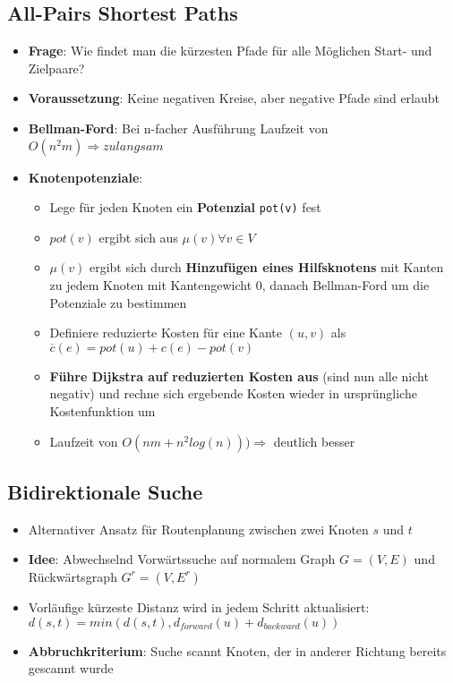 \subsection{All-Pairs Shortest Paths}%
\label{sp:sub:all_pairs_shortest_paths}

\begin{itemize}
	\item \textbf{Frage}: Wie findet man die kürzesten Pfade für alle Möglichen Start- und Zielpaare?
	\item \textbf{Voraussetzung}: Keine negativen Kreise, aber negative Pfade sind erlaubt
	\item \textbf{Bellman-Ford}: Bei n-facher Ausführung Laufzeit von $O(n^2m) \Rightarrow zu langsam$
	\item \textbf{Knotenpotenziale}:
	\begin{itemize}
		\item Lege für jeden Knoten ein \textbf{Potenzial} \texttt{pot(v)} fest
		\item $pot(v)$ ergibt sich aus $\mu(v) \forall v \in V$
		\item $\mu(v)$ ergibt sich durch \textbf{Hinzufügen eines Hilfsknotens} mit Kanten zu jedem Knoten mit Kantengewicht $0$, danach Bellman-Ford um die Potenziale zu bestimmen
		\item Definiere reduzierte Kosten für eine Kante $(u,v)$ als $\overline{c}(e) = pot(u) + c(e) - pot(v)$
		\item \textbf{Führe Dijkstra auf reduzierten Kosten aus} (sind nun alle nicht negativ) und rechne sich ergebende Kosten wieder in ursprüngliche Kostenfunktion um
		\item Laufzeit von $O(nm + n^2log(n))) \Rightarrow$ deutlich besser
	\end{itemize}
\end{itemize}

\subsection{Bidirektionale Suche}%
\label{sp:sub:bidirektionale_suche}

\begin{itemize}
	\item Alternativer Ansatz für Routenplanung zwischen zwei Knoten $s$ und $t$
	\item \textbf{Idee}: Abwechselnd Vorwärtssuche auf normalem Graph $G = (V,E)$ und Rückwärtsgraph $G^r = (V,E^r)$
	\item Vorläufige kürzeste Distanz wird in jedem Schritt aktualisiert:\\$d(s,t) = min(d(s,t), d_{forward}(u) + d_{backward}(u))$
	\item \textbf{Abbruchkriterium}: Suche scannt Knoten, der in anderer Richtung bereits gescannt wurde
\end{itemize}

